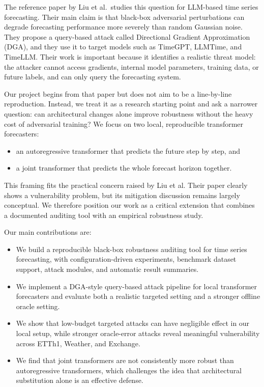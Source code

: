 \documentclass[11pt]{article}
\begin{document}
The reference paper by Liu et al.\ studies this question for LLM-based time series forecasting. Their main claim is that black-box adversarial perturbations can degrade forecasting performance more severely than random Gaussian noise. They propose a query-based attack called Directional Gradient Approximation (DGA), and they use it to target models such as TimeGPT, LLMTime, and TimeLLM. Their work is important because it identifies a realistic threat model: the attacker cannot access gradients, internal model parameters, training data, or future labels, and can only query the forecasting system.

Our project begins from that paper but does not aim to be a line-by-line reproduction. Instead, we treat it as a research starting point and ask a narrower question: can architectural changes alone improve robustness without the heavy cost of adversarial training? We focus on two local, reproducible transformer forecasters:
\begin{itemize}
  \item an autoregressive transformer that predicts the future step by step, and
  \item a joint transformer that predicts the whole forecast horizon together.
\end{itemize}

This framing fits the practical concern raised by Liu et al. Their paper clearly shows a vulnerability problem, but its mitigation discussion remains largely conceptual. We therefore position our work as a critical extension that combines a documented auditing tool with an empirical robustness study.

Our main contributions are:
\begin{itemize}
  \item We build a reproducible black-box robustness auditing tool for time series forecasting, with configuration-driven experiments, benchmark dataset support, attack modules, and automatic result summaries.
  \item We implement a DGA-style query-based attack pipeline for local transformer forecasters and evaluate both a realistic targeted setting and a stronger offline oracle setting.
  \item We show that low-budget targeted attacks can have negligible effect in our local setup, while stronger oracle-error attacks reveal meaningful vulnerability across ETTh1, Weather, and Exchange.
  \item We find that joint transformers are not consistently more robust than autoregressive transformers, which challenges the idea that architectural substitution alone is an effective defense.
\end{itemize}
\end{document}
